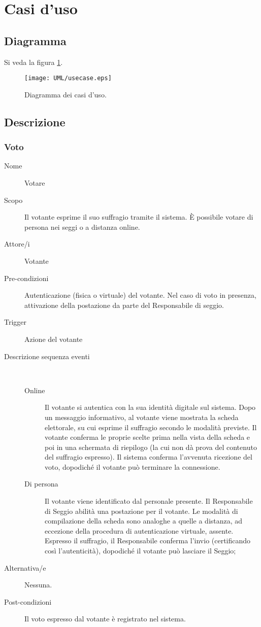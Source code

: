 \section{Casi d'uso}


\subsection{Diagramma}
Si veda la figura \ref{fig:usecasediag}.
\begin{figure}[ht]
	\centering
	\texttt{[image: UML/usecase.eps]}
	\caption{Diagramma dei casi d'uso.}
	\label{fig:usecasediag}
\end{figure}


\subsection{Descrizione}

\subsubsection{Voto}
\begin{description}
	\item[Nome] Votare
	\item[Scopo] Il votante esprime il suo suffragio tramite il sistema. È possibile votare di persona nei seggi o a distanza online.
	\item[Attore/i] Votante
	\item[Pre-condizioni] Autenticazione (fisica o virtuale) del votante. Nel caso di voto in presenza, attivazione della postazione da parte del Responsabile di seggio.
	\item[Trigger] Azione del votante
	\item[Descrizione sequenza eventi] ~
		\begin{description}
			\item[Online] Il votante si autentica con la sua identità digitale sul sistema. Dopo un messaggio informativo, al votante viene mostrata la scheda elettorale, su cui esprime il suffragio secondo le modalità previste. Il votante conferma le proprie scelte prima nella vista della scheda e poi in una schermata di riepilogo (la cui non dà prova del contenuto del suffragio espresso). Il sistema conferma l'avvenuta ricezione del voto, dopodiché il votante può terminare la connessione.
			\item[Di persona] Il votante viene identificato dal personale presente. Il Responsabile di Seggio abilità una postazione per il votante. Le modalità di compilazione della scheda sono analoghe a quelle a distanza, ad eccezione della procedura di autenticazione virtuale, assente. Espresso il suffragio, il Responsabile conferma l'invio (certificando così l'autenticità), dopodiché il votante può lasciare il Seggio;
		\end{description}
	\item[Alternativa/e] Nessuna.
	\item[Post-condizioni] Il voto espresso dal votante è registrato nel sistema.
\end{description}

